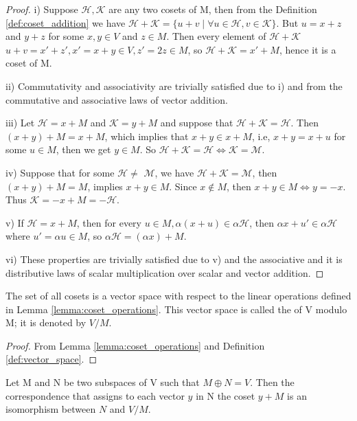 \documentclass[11pt,a4paper]{article}
\begin{document}
\begin{proof}
    i) Suppose $\mathcal{H},\mathcal{K}$ are any two cosets of M, then from the Definition \ref{def:coset_addition} we have $\mathcal{H+K}=\{u+v\;|\;\forall u\in \mathcal{H}, v\in \mathcal{K}\}$. But $u=x+z$ and $y+z$ for some $x,y\in V$ and $z\in M$. Then every element of $\mathcal{H+K}$ $u+v=x'+z',x'=x+y\in V,z'=2z\in M$, so $\mathcal{H+K}=x'+M$, hence it is a coset of M.

    ii) Commutativity and associativity are trivially satisfied due to i) and from the commutative and associative laws of vector addition.
    
    iii) Let $\mathcal{H}=x+M$ and $\mathcal{K}=y+M$ and suppose that $\mathcal{H+K}=\mathcal{H}$. Then $(x+y)+M=x+M$, which implies that $x+y\in x+M$, i.e, $x+y=x+u$ for some $u\in M$, then we get $y\in M$. So $\mathcal{H+K}=\mathcal{H}\Leftrightarrow \mathcal{K}=\mathcal{M}$.

    iv) Suppose that for some $\mathcal{H}\neq$ $\mathcal{M}$, we have $\mathcal{H+K=M}$, then $(x+y)+M=M$, implies $x+y\in M$. Since $x\notin M$, then $x+y\in M \Leftrightarrow y=-x$. Thus $\mathcal{K}=-x+M=\mathcal{-H}$. 

    v) If $\mathcal{H}=x+M$, then for every $u\in M, \alpha(x+u)\in \alpha \mathcal{H}$, then $\alpha x+u'\in \alpha \mathcal{H}$ where $u'=\alpha u\in  M$, so $\alpha \mathcal{H}=(\alpha x)+M$.

    vi) These properties are trivially satisfied due to v) and the  associative and it is distributive laws of scalar multiplication over scalar and vector addition.
\end{proof}

\begin{theorem}\label{def:quotient_space}
    The set of all cosets is a vector space with respect to the linear operations defined in Lemma \ref{lemma:coset_operations}. This vector space is called the  of V modulo M; it is denoted by $V/M$.
\end{theorem}

\begin{proof}
    From Lemma \ref{lemma:coset_operations} and Definition \ref{def:vector_space}.
\end{proof}

\begin{theorem}\label{thm:quotient_space}
    Let M and N be two subspaces of V such that $M\oplus N=V$. Then the correspondence that assigns to each vector $y$ in N the coset $y+M$ is an isomorphism between $N$ and $V/M$.
\end{theorem}
\end{document}
